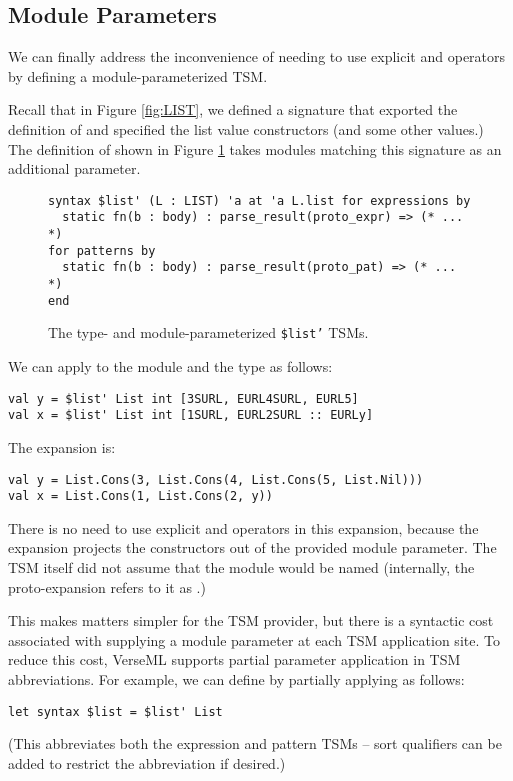 \subsection{Module Parameters}\label{sec:module-parameters}
We can finally address the inconvenience of needing to use explicit  and   operators by  defining a module-parameterized TSM.

Recall that in Figure \ref{fig:LIST}, we defined a signature  that exported the definition of  and specified the list value constructors (and some other values.) The definition of  shown in Figure \ref{fig:ptsm-listprime} takes modules matching this signature as an additional parameter.

\begin{figure}[h]
\begin{lstlisting}[numbers=none]
syntax $list' (L : LIST) 'a at 'a L.list for expressions by 
  static fn(b : body) : parse_result(proto_expr) => (* ... *)
for patterns by 
  static fn(b : body) : parse_result(proto_pat) => (* ... *)
end
\end{lstlisting}
\caption{The type- and module-parameterized \texttt{\$list'} TSMs.}
\label{fig:ptsm-listprime}
\end{figure}

We can apply  to the module  and the type  as follows:
\begin{lstlisting}[numbers=none]
val y = $list' List int [3SURL, EURL4SURL, EURL5]
val x = $list' List int [1SURL, EURL2SURL :: EURLy]
\end{lstlisting}
The expansion is:
\begin{lstlisting}[numbers=none]
val y = List.Cons(3, List.Cons(4, List.Cons(5, List.Nil)))
val x = List.Cons(1, List.Cons(2, y))
\end{lstlisting}
There is no need to use explicit  and  operators in this expansion, because the expansion projects the constructors out of the provided module parameter. The TSM itself did not assume that the module would be named  (internally, the proto-expansion refers to it as .)

This makes matters simpler for the TSM provider, but there is a syntactic cost associated with supplying a module parameter at each TSM application site. To reduce this cost, VerseML supports partial parameter application in TSM abbreviations. For example, we can define  by partially applying  as follows:
\begin{lstlisting}[numbers=none]
let syntax $list = $list' List
\end{lstlisting}
(This abbreviates both the expression and pattern TSMs -- sort qualifiers can be added to restrict the abbreviation if desired.)


